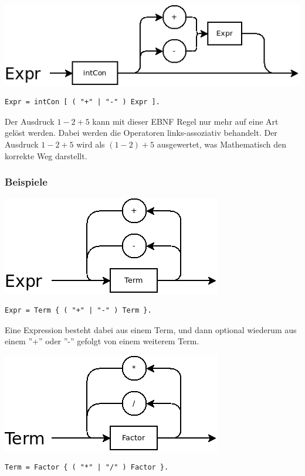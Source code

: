 
\includegraphics[scale=0.5]{./media/images/compiler/ambiguity_correct.png}

\begin{lstlisting}[language=EBNF]
Expr = intCon [ ( "+" | "-" ) Expr ].
\end{lstlisting}

Der Ausdruck $1-2+5$ kann mit dieser EBNF Regel nur mehr auf eine Art gelöst werden. Dabei werden die Operatoren links-assoziativ behandelt. Der Ausdruck $1-2+5$ wird als $(1-2)+5$ ausgewertet, was Mathematisch den korrekte Weg darstellt.

\subsubsection{Beispiele}

\includegraphics[scale=0.5]{./media/images/compiler/ebnf_expr.png}

\begin{lstlisting}[language=EBNF]
Expr = Term { ( "+" | "-" ) Term }.
\end{lstlisting}

Eine Expression besteht dabei aus einem Term, und dann optional wiederum aus einem ''+'' oder ''-'' gefolgt von einem weiterem Term.

\includegraphics[scale=0.5]{./media/images/compiler/ebnf_term.png}
\begin{lstlisting}[language=EBNF]
Term = Factor { ( "*" | "/" ) Factor }.
\end{lstlisting}

